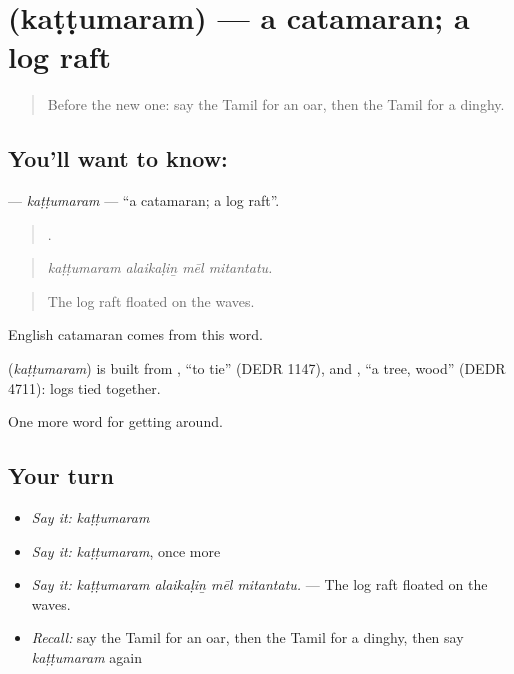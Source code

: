 \section[\texorpdfstring{\ta{கட்டுமரம்} (kaṭṭumaram)}{கட்டுமரம் (kaṭṭumaram)}]{ (kaṭṭumaram) — a catamaran; a log raft}

\label{lesson:TA-C416-kattumaram}



\begin{quote}
Before the new one: say the Tamil for an oar, then the Tamil for a dinghy.
\end{quote}

\subsection*{You'll want to know: }
\textbf{} — \emph{kaṭṭumaram} — \textquotedblleft{}a catamaran; a log raft\textquotedblright{}.

\begin{quote}
   .
\end{quote}

\begin{quote}
\emph{kaṭṭumaram alaikaḷiṉ mēl mitantatu.}
\end{quote}

\begin{quote}
The log raft floated on the waves.
\end{quote}

English catamaran comes from this word.

\begin{cousinweb}
\textbf{} (\emph{kaṭṭumaram}) is built from , \textquotedblleft{}to tie\textquotedblright{} (DEDR 1147), and , \textquotedblleft{}a tree, wood\textquotedblright{} (DEDR 4711): logs tied together.
\end{cousinweb}

\begin{grammarlens}[title={What you've built}]
One more word for getting around.
\end{grammarlens}

\subsection*{Your turn}
\begin{itemize}
\raggedright
  \item \emph{Say it:} \emph{kaṭṭumaram}
  \item \emph{Say it:} \emph{kaṭṭumaram}, once more
  \item \emph{Say it:} \emph{kaṭṭumaram alaikaḷiṉ mēl mitantatu.} — The log raft floated on the waves.
  \item \emph{Recall:} say the Tamil for an oar, then the Tamil for a dinghy, then say \emph{kaṭṭumaram} again
\end{itemize}

